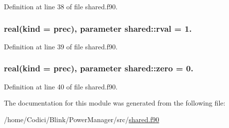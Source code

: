 Definition at line 38 of file shared.\-f90.

\hypertarget{classshared_a1e6d2e57c52bc7d2d6e76ff50759bb36}{
\subsubsection[{rval}]{\setlength{\rightskip}{0pt plus 5cm}real(kind = {\bf prec}), parameter shared\-::rval = 1.}}\label{classshared_a1e6d2e57c52bc7d2d6e76ff50759bb36}


Definition at line 39 of file shared.\-f90.

\hypertarget{classshared_a12330d78292ab20be87d5801140eaef0}{
\subsubsection[{zero}]{\setlength{\rightskip}{0pt plus 5cm}real(kind = {\bf prec}), parameter shared\-::zero = 0.}}\label{classshared_a12330d78292ab20be87d5801140eaef0}


Definition at line 40 of file shared.\-f90.



The documentation for this module was generated from the following file\-:\begin{DoxyCompactItemize}
\item 
/home/\-Codici/\-Blink/\-Power\-Manager/src/\hyperlink{shared_8f90}{shared.\-f90}\end{DoxyCompactItemize}
